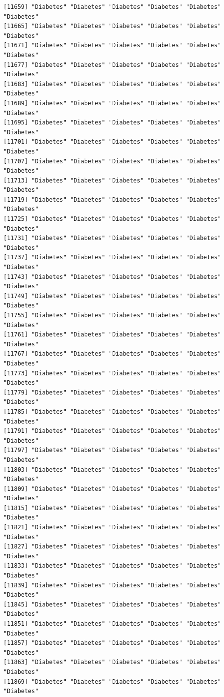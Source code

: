 \documentclass[
  letterpaper,
  DIV=11,
  numbers=noendperiod]{scrartcl}
\begin{document}
\begin{verbatim}
[11659] "Diabetes" "Diabetes" "Diabetes" "Diabetes" "Diabetes" "Diabetes"
[11665] "Diabetes" "Diabetes" "Diabetes" "Diabetes" "Diabetes" "Diabetes"
[11671] "Diabetes" "Diabetes" "Diabetes" "Diabetes" "Diabetes" "Diabetes"
[11677] "Diabetes" "Diabetes" "Diabetes" "Diabetes" "Diabetes" "Diabetes"
[11683] "Diabetes" "Diabetes" "Diabetes" "Diabetes" "Diabetes" "Diabetes"
[11689] "Diabetes" "Diabetes" "Diabetes" "Diabetes" "Diabetes" "Diabetes"
[11695] "Diabetes" "Diabetes" "Diabetes" "Diabetes" "Diabetes" "Diabetes"
[11701] "Diabetes" "Diabetes" "Diabetes" "Diabetes" "Diabetes" "Diabetes"
[11707] "Diabetes" "Diabetes" "Diabetes" "Diabetes" "Diabetes" "Diabetes"
[11713] "Diabetes" "Diabetes" "Diabetes" "Diabetes" "Diabetes" "Diabetes"
[11719] "Diabetes" "Diabetes" "Diabetes" "Diabetes" "Diabetes" "Diabetes"
[11725] "Diabetes" "Diabetes" "Diabetes" "Diabetes" "Diabetes" "Diabetes"
[11731] "Diabetes" "Diabetes" "Diabetes" "Diabetes" "Diabetes" "Diabetes"
[11737] "Diabetes" "Diabetes" "Diabetes" "Diabetes" "Diabetes" "Diabetes"
[11743] "Diabetes" "Diabetes" "Diabetes" "Diabetes" "Diabetes" "Diabetes"
[11749] "Diabetes" "Diabetes" "Diabetes" "Diabetes" "Diabetes" "Diabetes"
[11755] "Diabetes" "Diabetes" "Diabetes" "Diabetes" "Diabetes" "Diabetes"
[11761] "Diabetes" "Diabetes" "Diabetes" "Diabetes" "Diabetes" "Diabetes"
[11767] "Diabetes" "Diabetes" "Diabetes" "Diabetes" "Diabetes" "Diabetes"
[11773] "Diabetes" "Diabetes" "Diabetes" "Diabetes" "Diabetes" "Diabetes"
[11779] "Diabetes" "Diabetes" "Diabetes" "Diabetes" "Diabetes" "Diabetes"
[11785] "Diabetes" "Diabetes" "Diabetes" "Diabetes" "Diabetes" "Diabetes"
[11791] "Diabetes" "Diabetes" "Diabetes" "Diabetes" "Diabetes" "Diabetes"
[11797] "Diabetes" "Diabetes" "Diabetes" "Diabetes" "Diabetes" "Diabetes"
[11803] "Diabetes" "Diabetes" "Diabetes" "Diabetes" "Diabetes" "Diabetes"
[11809] "Diabetes" "Diabetes" "Diabetes" "Diabetes" "Diabetes" "Diabetes"
[11815] "Diabetes" "Diabetes" "Diabetes" "Diabetes" "Diabetes" "Diabetes"
[11821] "Diabetes" "Diabetes" "Diabetes" "Diabetes" "Diabetes" "Diabetes"
[11827] "Diabetes" "Diabetes" "Diabetes" "Diabetes" "Diabetes" "Diabetes"
[11833] "Diabetes" "Diabetes" "Diabetes" "Diabetes" "Diabetes" "Diabetes"
[11839] "Diabetes" "Diabetes" "Diabetes" "Diabetes" "Diabetes" "Diabetes"
[11845] "Diabetes" "Diabetes" "Diabetes" "Diabetes" "Diabetes" "Diabetes"
[11851] "Diabetes" "Diabetes" "Diabetes" "Diabetes" "Diabetes" "Diabetes"
[11857] "Diabetes" "Diabetes" "Diabetes" "Diabetes" "Diabetes" "Diabetes"
[11863] "Diabetes" "Diabetes" "Diabetes" "Diabetes" "Diabetes" "Diabetes"
[11869] "Diabetes" "Diabetes" "Diabetes" "Diabetes" "Diabetes" "Diabetes"

\end{verbatim}
\end{document}
